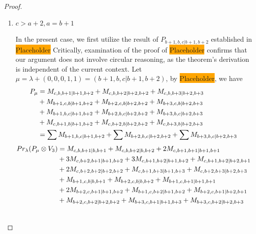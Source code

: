 \begin{proof}
\begin{enumerate}
\begin{enumerate}
        \item $c>a+2,a=b+1$ \par
        In the present case, we first utilize the result of $P_{b+1,b,c|b+1,b+2}$ established in \colorbox{orange}{Placeholder} Critically, examination of the proof of \colorbox{orange}{Placeholder} confirms that our argument does not involve circular reasoning, as the theorem's derivation is independent of the current context. Let $\mu = \lambda + (0,0,0,1,1) =(b+1,b,c|b+1,b+2) $, by \colorbox{orange}{Placeholder}, we have
        \begin{equation}\notag
          \begin{aligned}
            P_\mu &= 
M_{c,b,b+1|b+1,b+2}
+M_{c,b,b+2|b+2,b+2}
+M_{c,b,b+3|b+2,b+3}\\
                                              &
+M_{b+1,c,b|b+1,b+2}
+M_{b+2,c,b|b+2,b+2}
+M_{b+3,c,b|b+2,b+3}\\
                                              &
+M_{b+1,b,c|b+1,b+2}
+M_{b+2,b,c|b+2,b+2}
+M_{b+3,b,c|b+2,b+3}\\
                                              &
+M_{c,b+1,b|b+1,b+2}
+M_{c,b+2,b|b+2,b+2}
+M_{c,b+3,b|b+2,b+3}\\
                  &=
\sum M_{b+1,b,c|b+1,b+2}
+\sum M_{b+2,b,c|b+2,b+2}
+\sum M_{b+3,b,c|b+2,b+3}
          \end{aligned}
        \end{equation}
        \begin{equation}\notag
          \begin{aligned}
            Pr_{\lambda}(P_\mu \otimes V_{3}) &=
M_{c,b,b+1|b,b+1}
+ M_{c,b,b+2|b,b+2}
+ 2M_{c,b+1,b+1|b+1,b+1}\\
                                              &
+ 3M_{c,b+2,b+1|b+1,b+2}
+ 3M_{c,b+1,b+2|b+1,b+2}
+ M_{c,b+1,b+2|b+2,b+1}\\
                                              &
+ 2M_{c,b+2,b+2|b+2,b+2}
+ M_{c,b+1,b+3|b+1,b+3}
+ M_{c,b+2,b+3|b+2,b+3}\\
                                              &
+ M_{b+1,c,b|b,b+1}
+ M_{b+2,c,b|b,b+2}
+ M_{b+1,c,b+1|b+1,b+1}\\
                                              &
+ 2M_{b+2,c,b+1|b+1,b+2}
+ M_{b+1,c,b+2|b+1,b+2}
+ M_{b+2,c,b+1|b+2,b+1}\\
                                              &
+ M_{b+2,c,b+2|b+2,b+2}
+ M_{b+3,c,b+1|b+1,b+3}
+ M_{b+3,c,b+2|b+2,b+3}\\
                                              &

\end{aligned}
\end{equation}
\end{enumerate}
\end{enumerate}
\end{proof}
